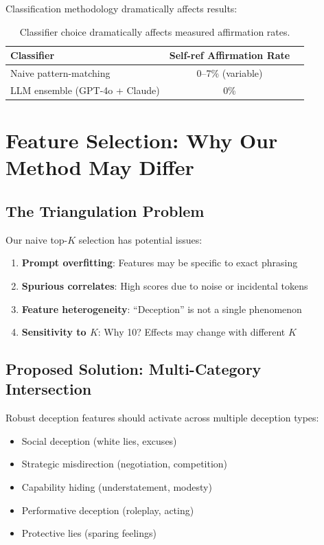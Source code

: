 \documentclass[11pt]{article}
\begin{document}
Classification methodology dramatically affects results:

\begin{table}[H]
\centering
\begin{tabular}{lcc}
\toprule
Classifier & Self-ref Affirmation Rate \\
\midrule
Naive pattern-matching & 0--7\% (variable) \\
LLM ensemble (GPT-4o + Claude) & 0\% \\
\bottomrule
\end{tabular}
\caption{Classifier choice dramatically affects measured affirmation rates.}
\end{table}

\section{Feature Selection: Why Our Method May Differ}

\subsection{The Triangulation Problem}

Our naive top-$K$ selection has potential issues:

\begin{enumerate}
    \item \textbf{Prompt overfitting}: Features may be specific to exact phrasing
    \item \textbf{Spurious correlates}: High scores due to noise or incidental tokens
    \item \textbf{Feature heterogeneity}: ``Deception'' is not a single phenomenon
    \item \textbf{Sensitivity to $K$}: Why 10? Effects may change with different $K$
\end{enumerate}

\subsection{Proposed Solution: Multi-Category Intersection}

Robust deception features should activate across multiple deception types:

\begin{itemize}
    \item Social deception (white lies, excuses)
    \item Strategic misdirection (negotiation, competition)
    \item Capability hiding (understatement, modesty)
    \item Performative deception (roleplay, acting)
    \item Protective lies (sparing feelings)
\end{itemize}
\end{document}

